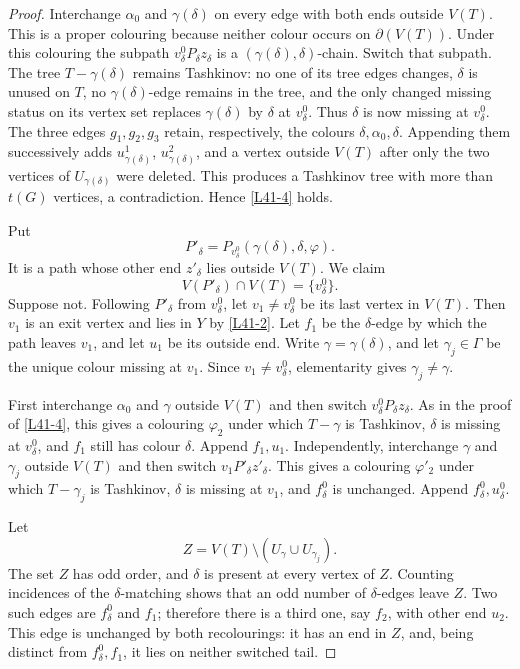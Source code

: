 \documentclass[11pt]{article}
\theoremstyle{definition}
\newcommand{\set}[1]{\{#1\}}
\newcommand{\comp}{\mathbin{\setminus}}
\begin{document}
\begin{proof}
Interchange $\alpha_0$ and $\gamma(\delta)$ on every edge with both ends
outside $V(T)$. This is a proper colouring because neither colour occurs
on $\partial(V(T))$. Under this colouring the subpath
$v^0_\delta P_\delta z_\delta$ is a
$(\gamma(\delta),\delta)$-chain. Switch that subpath. The tree
$T-\gamma(\delta)$ remains Tashkinov: no one of its tree edges changes,
$\delta$ is unused on $T$, no $\gamma(\delta)$-edge remains in the tree,
and the only changed missing status on its vertex set replaces
$\gamma(\delta)$ by $\delta$ at $v^0_\delta$. Thus $\delta$ is now missing
at $v^0_\delta$. The three edges $g_1,g_2,g_3$ retain, respectively, the
colours $\delta,\alpha_0,\delta$. Appending them successively adds
$u^1_{\gamma(\delta)}$, $u^2_{\gamma(\delta)}$, and a vertex outside
$V(T)$ after only the two vertices of $U_{\gamma(\delta)}$ were deleted.
This produces a Tashkinov tree with more than $t(G)$ vertices, a
contradiction. Hence \eqref{L41-4} holds.

Put
\[
 P'_\delta=P_{v^0_\delta}(\gamma(\delta),\delta,\varphi).
\]
It is a path whose other end $z'_\delta$ lies outside $V(T)$. We claim
\begin{equation}
 V(P'_\delta)\cap V(T)=\set{v^0_\delta}.
 \tag{5}\label{L41-5}
\end{equation}
Suppose not. Following $P'_\delta$ from $v^0_\delta$, let
$v_1\ne v^0_\delta$ be its last vertex in $V(T)$. Then $v_1$ is an exit
vertex and lies in $Y$ by \eqref{L41-2}. Let $f_1$ be the
$\delta$-edge by which the path leaves $v_1$, and let $u_1$ be its outside
end. Write $\gamma=\gamma(\delta)$, and let
$\gamma_j\in\Gamma$ be the unique colour missing at $v_1$. Since
$v_1\ne v^0_\delta$, elementarity gives $\gamma_j\ne\gamma$.

First interchange $\alpha_0$ and $\gamma$ outside $V(T)$ and then switch
$v^0_\delta P_\delta z_\delta$. As in the proof of \eqref{L41-4}, this
gives a colouring $\varphi_2$ under which $T-\gamma$ is Tashkinov,
$\delta$ is missing at $v^0_\delta$, and $f_1$ still has colour
$\delta$. Append $f_1,u_1$. Independently, interchange $\gamma$ and
$\gamma_j$ outside $V(T)$ and then switch
$v_1P'_\delta z'_\delta$. This gives a colouring $\varphi'_2$ under
which $T-\gamma_j$ is Tashkinov, $\delta$ is missing at $v_1$, and
$f^0_\delta$ is unchanged. Append $f^0_\delta,u^0_\delta$.

Let
\[
 Z=V(T)\comp(U_\gamma\cup U_{\gamma_j}).
\]
The set $Z$ has odd order, and $\delta$ is present at every vertex of $Z$.
Counting incidences of the $\delta$-matching shows that an odd number of
$\delta$-edges leave $Z$. Two such edges are $f^0_\delta$ and $f_1$;
therefore there is a third one, say $f_2$, with other end $u_2$. This edge
is unchanged by both recolourings: it has an end in $Z$, and, being
distinct from $f^0_\delta,f_1$, it lies on neither switched tail.


\end{proof}
\end{document}
